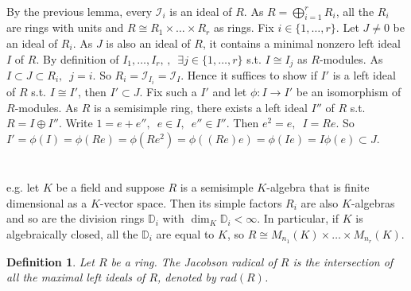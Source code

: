 \documentclass[12pt,letterpaper]{report}
\newtheorem{definition}{Definition}[section]
\begin{document}
\\By the previous lemma, every $\mathcal{I}_{i}$ is an ideal of $R$. As $R=\bigoplus_{i=1}^{r}R_{i}$, all the $R_{i}$ are rings with units and $R\cong R_{1}\times\dots\times R_{r}$ as rings. Fix $i\in\{1,\dots,r\}$. Let $J\neq0$ be an ideal of $R_{i}$. As $J$ is also an ideal of $R$, it contains a minimal nonzero left ideal $I$ of $R$. By definition of $I_{1},\dots,I_{r},\,,\,\,\,\exists j\in\{1,\dots,r\}$ s.t. $I\cong I_{j}$ as $R$-modules. As $I\subset J\subset R_{i},\,\,\,j=i$. So $R_{i}=\mathcal{I}_{I_{i}}=\mathcal{I}_{I}$. Hence it suffices to show if $I'$ is a left ideal of $R$ s.t. $I\cong I'$, then $I'\subset J$. Fix such a $I'$ and let $\phi:I\rightarrow I'$ be an isomorphism of $R$-modules. As $R$ is a semisimple ring, there exists a left ideal $I''$ of $R$ s.t. $R=I\oplus I''$. Write $1=e+e'',\,\,\,e\in I,\,\,\,e''\in I''$. Then $e^{2}=e,\,\,\,I=Re$. So $I'=\phi(I)=\phi(Re)=\phi(Re^{2})=\phi((Re)e)=\phi(Ie)=I\phi(e)\subset J$. 
\\\\\\e.g. let $K$ be a field and suppose $R$ is a semisimple $K$-algebra that is finite dimensional as a $K$-vector space. Then its simple factors $R_{i}$ are also $K$-algebras and so are the division rings $\mathbb{D}_{i}$ with $\dim_{K}\mathbb{D}_{i}<\infty$. In particular, if $K$ is algebraically closed, all the $\mathbb{D}_{i}$ are equal to $K$, so $R\cong M_{n_{1}}(K)\times\dots\times M_{n_{r}}(K)$.  

\begin{definition}Let $R$ be a ring. The Jacobson radical of $R$ is the intersection of all the maximal left ideals of $R$, denoted by $rad(R)$.\end{definition}
\end{document}
